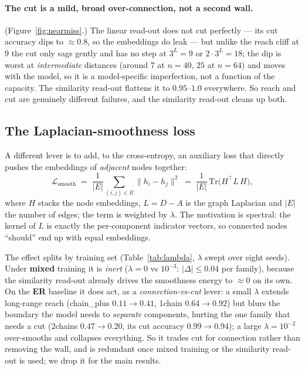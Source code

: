 \documentclass[11pt,a4paper]{article}
\begin{document}
\paragraph{The cut is a mild, broad over-connection, not a second wall.}
(Figure~\ref{fig:nearmiss}.) The linear read-out does not cut perfectly --- its cut accuracy
dips to $\approx0.8$, so the embeddings do leak --- but unlike the reach cliff at $9$ the cut
only sags gently and has no step at $3^L=9$ or $2\cdot 3^L=18$; the dip is worst at
\emph{intermediate} distances (around $7$ at $n=40$, $25$ at $n=64$) and moves with the
model, so it is a model-specific imperfection, not a function of the capacity. The similarity
read-out flattens it to $0.95$--$1.0$ everywhere. So reach and cut are genuinely different
failures, and the similarity read-out cleans up both.

\subsection{The Laplacian-smoothness loss}

A different lever is to add, to the cross-entropy, an auxiliary loss that directly pushes the
embeddings of \emph{adjacent} nodes together:
\[ \mathcal{L}_{\mathrm{smooth}} \;=\; \frac{1}{|E|}\sum_{(i,j)\in E}\lVert h_i-h_j\rVert^2
   \;=\; \frac{1}{|E|}\,\mathrm{Tr}\!\big(H^\top L\, H\big), \]
where $H$ stacks the node embeddings, $L=D-A$ is the graph Laplacian and $|E|$ the number of
edges; the term is weighted by $\lambda$. The motivation is spectral: the kernel of $L$ is exactly
the per-component indicator vectors, so connected nodes ``should'' end up with equal embeddings.

The effect splits by training set (Table~\ref{tab:lambda}, $\lambda$ swept over eight seeds).
Under \textbf{mixed} training it is \emph{inert} ($\lambda=0$ vs $10^{-3}$: $|\Delta|\le0.04$ per
family), because the similarity read-out already drives the smoothness energy to $\approx0$ on
its own. On the \textbf{ER} baseline it does act, as a \emph{connection-vs-cut} lever: a small
$\lambda$ extends long-range reach (chain\_plus $0.11\to0.41$, 1chain $0.64\to0.92$) but blurs
the boundary the model needs to \emph{separate} components, hurting the one family that needs a
cut (2chains $0.47\to0.20$, its cut accuracy $0.99\to0.94$); a large $\lambda=10^{-2}$
over-smooths and collapses everything. So it trades cut for connection rather than removing the
wall, and is redundant once mixed training or the similarity read-out is used; we drop it for the
main results.
\end{document}
